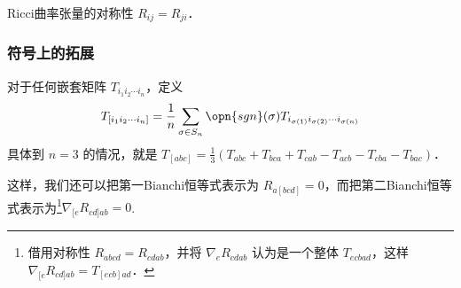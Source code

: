 \begin{theorem}{Ricci曲率张量的对称性}
$R_{ij}=R_{ji}$．
\end{theorem}

\subsubsection{符号上的拓展}

对于任何嵌套矩阵 $T_{i_1i_2\cdots i_n}$，定义
\begin{equation}
T_{[i_1i_2\cdots i_n]}=\frac{1}{n}\sum\limits_{\sigma\in S_n}\opn{sgn}(\sigma)T_{i_{\sigma(1)}i_{\sigma(2)}\cdots i_{\sigma(n)}}
\end{equation}
具体到 $n=3$ 的情况，就是 $T_{[abc]}=\frac{1}{3}(T_{abc}+T_{bca}+T_{cab}-T_{acb}-T_{cba}-T_{bac})$．





这样，我们还可以把第一Bianchi恒等式表示为 $R_{a[bcd]}=0$，而把第二Bianchi恒等式表示为\footnote{借用对称性 $R_{abcd}=R_{cdab}$，并将 $\nabla_eR_{cdab}$ 认为是一个整体 $T_{ecbad}$，这样 $\nabla_{[e}R_{cd]ab}=T_{[ecb]ad}$．}$\nabla_{[e}R_{cd]ab}=0$.








